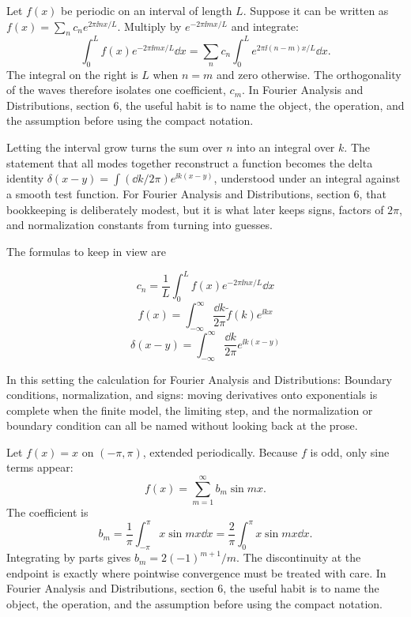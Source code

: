 Let \(f(x)\) be periodic on an interval of length \(L\).  Suppose it can be written as \(f(x)=\sum_n c_ne^{2\pi\ii nx/L}\).  Multiply by \(e^{-2\pi\ii mx/L}\) and integrate:
\[
  \int_0^L f(x)e^{-2\pi\ii mx/L}\dd x
  =
  \sum_n c_n\int_0^L e^{2\pi\ii(n-m)x/L}\dd x.
\]
The integral on the right is \(L\) when \(n=m\) and zero otherwise.  The orthogonality of the waves therefore isolates one coefficient, \(c_m\).  In Fourier Analysis and Distributions, section 6, the useful habit is to name the object, the operation, and the assumption before using the compact notation.

Letting the interval grow turns the sum over \(n\) into an integral over \(k\).  The statement that all modes together reconstruct a function becomes the delta identity \(\delta(x-y)=\int(\dd k/2\pi)e^{\ii k(x-y)}\), understood under an integral against a smooth test function.  For Fourier Analysis and Distributions, section 6, that bookkeeping is deliberately modest, but it is what later keeps signs, factors of \(2\pi\), and normalization constants from turning into guesses.

The formulas to keep in view are

\[
  c_n=\frac1L\int_0^L f(x)e^{-2\pi\ii nx/L}\dd x
\]
\[
  f(x)=\int_{-\infty}^{\infty}\frac{\dd k}{2\pi}\tilde f(k)e^{\ii kx}
\]
\[
  \delta(x-y)=\int_{-\infty}^{\infty}\frac{\dd k}{2\pi}e^{\ii k(x-y)}
\]

In this setting the calculation for Fourier Analysis and Distributions: Boundary conditions, normalization, and signs: moving derivatives onto exponentials is complete when the finite model, the limiting step, and the normalization or boundary condition can all be named without looking back at the prose.




\begin{example}
Let \(f(x)=x\) on \((-\pi,\pi)\), extended periodically.  Because \(f\) is odd, only sine terms appear:
\[
  f(x)=\sum_{m=1}^\infty b_m\sin mx.
\]
The coefficient is
\[
  b_m=\frac1\pi\int_{-\pi}^\pi x\sin mx\dd x
  =\frac2\pi\int_0^\pi x\sin mx\dd x.
\]
Integrating by parts gives \(b_m=2(-1)^{m+1}/m\).  The discontinuity at the endpoint is exactly where pointwise convergence must be treated with care.  In Fourier Analysis and Distributions, section 6, the useful habit is to name the object, the operation, and the assumption before using the compact notation.
\end{example}



